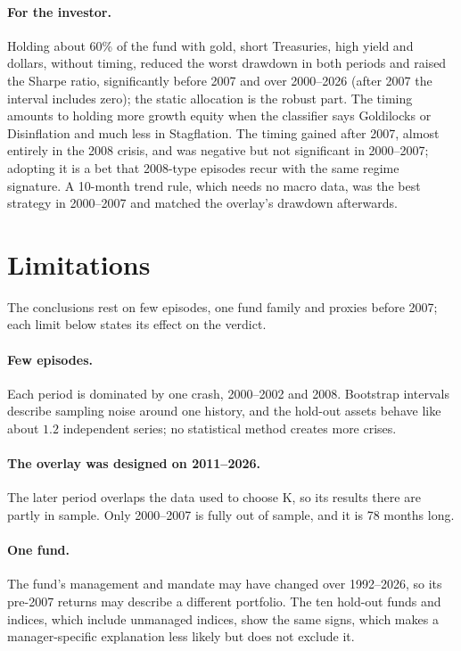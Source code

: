 \documentclass[11pt,a4paper]{article}
\begin{document}
\paragraph{For the investor.} Holding about 60\% of the fund with gold, short Treasuries, high yield and dollars,
without timing, reduced the worst drawdown in both periods and raised the Sharpe ratio, significantly before
2007 and over 2000--2026 (after 2007 the interval includes zero); the static allocation is the robust part.
The timing amounts to holding more growth equity when the classifier says Goldilocks or Disinflation and much less in Stagflation. The timing gained after 2007, almost entirely in the 2008 crisis, and was negative but not significant in 2000--2007; adopting it is a bet that 2008-type episodes recur with the same regime signature. A 10-month trend rule, which needs no macro data, was the best strategy in
2000--2007 and matched the overlay's drawdown afterwards.

\section{Limitations}

The conclusions rest on few episodes, one fund family and proxies before 2007; each limit below states its effect on the verdict.


\paragraph{Few episodes.} Each period is dominated by one crash, 2000--2002 and 2008. Bootstrap intervals describe
sampling noise around one history, and the hold-out assets behave like about $1.2$ independent series; no
statistical method creates more crises.

\paragraph{The overlay was designed on 2011--2026.} The later period overlaps the data used to choose K, so its
results there are partly in sample. Only 2000--2007 is fully out of sample, and it is 78 months long.

\paragraph{One fund.} The fund's management and mandate may have changed over 1992--2026, so its pre-2007 returns may describe a
different portfolio. The ten hold-out funds and indices, which include unmanaged indices, show the same signs, which makes a
manager-specific explanation less likely but does not exclude it.
\end{document}
